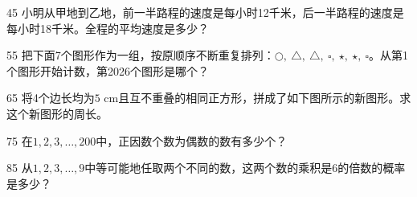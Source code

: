 \begin{question}{4}{5}
小明从甲地到乙地，前一半路程的速度是每小时12千米，后一半路程的速度是每小时18千米。全程的平均速度是多少？
\begin{choices}
\end{choices}
\end{question}

\begin{question}{5}{5}
把下面7个图形作为一组，按原顺序不断重复排列：\(\bigcirc,\ \triangle,\ \triangle,\ \square,\ \star,\ \star,\ \square\)。从第1个图形开始计数，第2026个图形是哪个？
\begin{choices}
  \choice{\(\bigcirc\)}
  \choice{\(\star\)}
  \choice{\(\square\)}
  \choice{\(\triangle\)}
\end{choices}
\end{question}

\begin{question}{6}{5}
将4个边长均为\(5\text{ cm}\)且互不重叠的相同正方形，拼成了如下图所示的新图形。求这个新图形的周长。

\begin{center}
\end{center}

\begin{choices}
\end{choices}
\end{question}

\begin{question}{7}{5}
在\(1,2,3,\ldots,200\)中，正因数个数为偶数的数有多少个？
\begin{choices}
\end{choices}
\end{question}

\begin{question}{8}{5}
从\(1,2,3,\ldots,9\)中等可能地任取两个不同的数，这两个数的乘积是6的倍数的概率是多少？
\begin{choices}
\end{choices}
\end{question}

